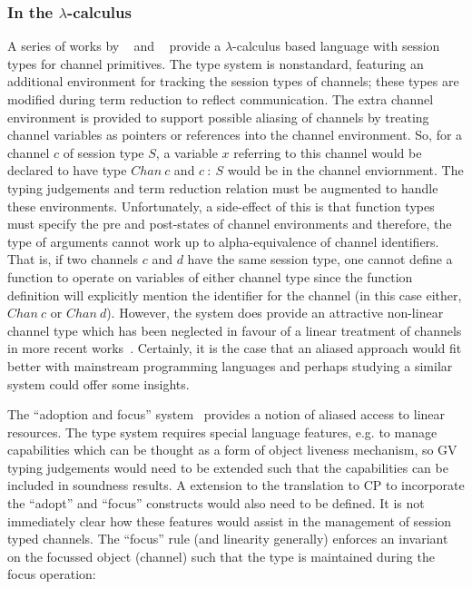\documentclass{mprop}
\begin{document}
\subsubsection{In the \texorpdfstring{$\lambda$}{lambda}-calculus}
\label{sec:lam}

A series of works by \citeauthor{Gay:2003:STI}~\cite{Gay:2003:STI} and
\citeauthor{Vasconcelos:2006:TCM}~\cite{Vasconcelos:2006:TCM} provide a
$\lambda$-calculus based language with session types for channel
primitives. The type system is nonstandard, featuring an additional
environment for tracking the session types of channels; these types are
modified during term reduction to reflect communication. The extra channel
environment is provided to support possible aliasing of channels by treating
channel variables as pointers or references into the channel environment. So,
for a channel $c$ of session type $S$, a variable $x$ referring to this
channel would be declared to have type $Chan~c$ and $c~:~S$ would be in the
channel enviornment. The typing judgements and term reduction relation must be
augmented to handle these environments. Unfortunately, a side-effect of this
is that function types must specify the pre and post-states of channel
environments and therefore, the type of arguments cannot work up to
alpha-equivalence of channel identifiers. That is, if two channels $c$ and $d$
have the same session type, one cannot define a function to operate on
variables of either channel type since the function definition will explicitly
mention the identifier for the channel (in this case either, $Chan~c$ or
$Chan~d$). However, the system does provide an attractive non-linear channel
type which has been neglected in favour of a linear treatment of channels in
more recent
works~\cite{Gay:2010:LAST,Mazurak:2010:LCC,Wadler:2014}. Certainly, it is the
case that an aliased approach would fit better with mainstream programming
languages and perhaps studying a similar system could offer some insights.

The ``adoption and focus'' system~\cite{Fahndrich:2002} provides a notion of
aliased access to linear resources. The type system requires special language
features, e.g. to manage capabilities which can be thought as a form of object
liveness mechanism, so GV typing judgements would need to be extended such
that the capabilities can be included in soundness results. A extension to the
translation to CP to incorporate the ``adopt'' and ``focus'' constructs would
also need to be defined. It is not immediately clear how these features would
assist in the management of session typed channels. The ``focus'' rule (and
linearity generally) enforces an invariant on the focussed object (channel)
such that the type is maintained during the focus operation:
\end{document}
